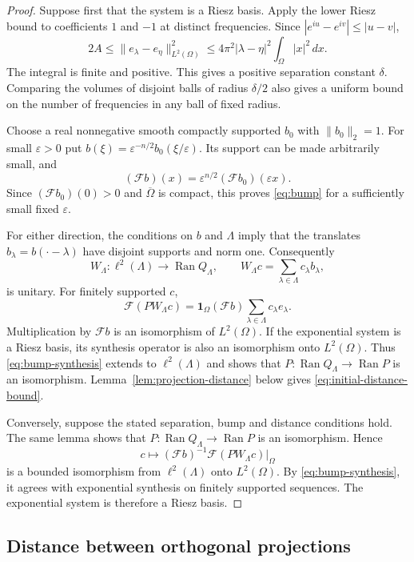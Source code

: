 \documentclass[a4paper,12pt,reqno]{amsart}
\theoremstyle{remark}
\numberwithin{equation}{section}
\newcommand{\Ff}{\mathcal F}
\newcommand{\one}{\mathbf 1}
\DeclareMathOperator{\Ran}{Ran}
\begin{document}
\begin{proof}
Suppose first that the system is a Riesz basis. Apply the lower Riesz bound to coefficients $1$ and $-1$ at distinct
frequencies. Since $|e^{iu}-e^{iv}|\leq|u-v|$,
\[
 2A\leq\|e_\lambda-e_\eta\|_{L^2(\Omega)}^2
 \leq4\pi^2|\lambda-\eta|^2\int_\Omega|x|^2\,dx.
\]
The integral is finite and positive. This gives a positive separation
constant $\delta$. Comparing the volumes of disjoint balls of radius
$\delta/2$ also gives a uniform bound on the number of frequencies in any
ball of fixed radius.

Choose a real nonnegative smooth compactly supported $b_0$ with
$\|b_0\|_2=1$. For small $\varepsilon>0$ put
$b(\xi)=\varepsilon^{-n/2}b_0(\xi/\varepsilon)$. Its support can be made arbitrarily small, and
\[
 (\Ff b)(x)=\varepsilon^{n/2}(\Ff b_0)(\varepsilon x).
\]
Since $(\Ff b_0)(0)>0$ and $\overline\Omega$ is compact, this proves
\eqref{eq:bump} for a sufficiently small fixed $\varepsilon$.

For either direction, the conditions on $b$ and $\Lambda$ imply that the
translates $b_\lambda=b(\cdot-\lambda)$ have disjoint supports and
norm one. Consequently
\[
 W_\Lambda:\ell^2(\Lambda)\longrightarrow\Ran Q_\Lambda,
 \qquad W_\Lambda c=\sum_{\lambda\in\Lambda}c_\lambda b_\lambda,
\]
is unitary. For finitely supported $c$,
\begin{equation}\label{eq:bump-synthesis}
 \Ff(PW_\Lambda c)
 =\one_\Omega(\Ff b)\sum_{\lambda\in\Lambda}c_\lambda e_\lambda.
\end{equation}
Multiplication by $\Ff b$ is an isomorphism of $L^2(\Omega)$.
If the exponential system is a Riesz basis, its synthesis operator is
also an isomorphism onto $L^2(\Omega)$. Thus \eqref{eq:bump-synthesis}
extends to $\ell^2(\Lambda)$ and shows that
$P:\Ran Q_\Lambda\to\Ran P$ is an isomorphism.
Lemma~\ref{lem:projection-distance} below gives
\eqref{eq:initial-distance-bound}.

Conversely, suppose the stated separation, bump and distance conditions
hold. The same lemma shows that
$P:\Ran Q_\Lambda\to\Ran P$ is an isomorphism. Hence
\[
 c\longmapsto (\Ff b)^{-1}\Ff(PW_\Lambda c)|_\Omega
\]
is a bounded isomorphism from $\ell^2(\Lambda)$ onto $L^2(\Omega)$.
By \eqref{eq:bump-synthesis}, it agrees with exponential synthesis on
finitely supported sequences. The exponential system is therefore a
Riesz basis.
\end{proof}

\subsection{Distance between orthogonal projections}
\end{document}
